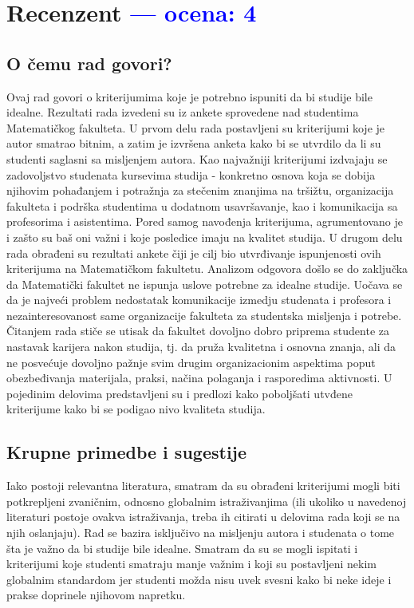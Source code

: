 \documentclass[a4paper]{report}
\newcommand{\odgovor}[1]{\textcolor{blue}{#1}}
\begin{document}
 \chapter{Recenzent \odgovor{--- ocena: 4} }
 
 
 \section{O čemu rad govori?}
 Ovaj rad govori o kriterijumima koje je potrebno ispuniti da bi studije bile idealne. Rezultati rada izvedeni su iz ankete sprovedene nad studentima Matematičkog fakulteta. U prvom delu rada postavljeni su kriterijumi koje je autor smatrao bitnim, a zatim je izvršena anketa kako bi se utvrdilo da li su studenti saglasni sa misljenjem autora. Kao najvažniji kriterijumi izdvajaju se zadovoljstvo studenata kursevima studija - konkretno osnova koja se dobija njihovim pohađanjem i potražnja za stečenim znanjima na tršižtu, organizacija fakulteta i podrška studentima u dodatnom usavršavanje, kao i komunikacija sa profesorima i asistentima. Pored samog navođenja kriterijuma, agrumentovano je i zašto su baš oni važni i koje posledice imaju na kvalitet studija. U drugom delu rada obrađeni su rezultati ankete čiji je cilj bio utvrđivanje ispunjenosti ovih kriterijuma na Matematičkom fakultetu. Analizom odgovora došlo se do zaključka da Matematički fakultet ne ispunja uslove potrebne za idealne studije. Uočava se da je najveći problem nedostatak komunikacije izmedju studenata i profesora i nezainteresovanost same organizacije fakulteta za studentska misljenja i potrebe. Čitanjem rada stiče se utisak da fakultet dovoljno dobro priprema studente za nastavak karijera nakon studija, tj. da pruža kvalitetna i osnovna znanja, ali da ne posvećuje dovoljno pažnje svim drugim organizacionim aspektima poput obezbeđivanja materijala, praksi, načina polaganja i rasporedima aktivnosti. U pojedinim delovima predstavljeni su i predlozi kako poboljšati utvđene kriterijume kako bi se podigao nivo kvaliteta studija.
 
 
 \section{Krupne primedbe i sugestije}
 Iako postoji relevantna literatura, smatram da su obrađeni kriterijumi mogli biti potkrepljeni zvaničnim, odnosno globalnim istraživanjima (ili ukoliko u navedenoj literaturi postoje ovakva istraživanja, treba ih citirati u delovima rada koji se na njih oslanjaju). Rad se bazira isključivo na misljenju autora i studenata o tome šta je važno da bi studije bile idealne. Smatram da su se mogli ispitati i kriterijumi koje studenti smatraju manje važnim i koji su postavljeni nekim globalnim standardom jer studenti možda nisu uvek svesni kako bi neke ideje i prakse doprinele njihovom napretku.
 
\end{document}
